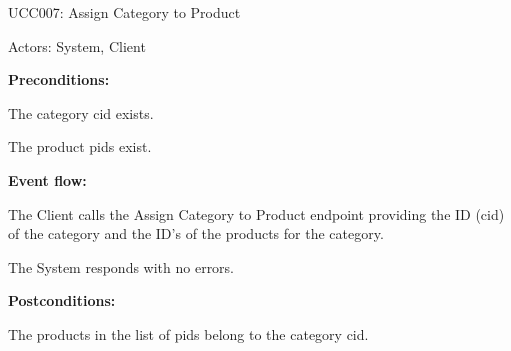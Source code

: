 \begin{ucbox}{UCC007: Assign Category to Product}
\label{UCC007}

Actors: System, Client

\textbf{Preconditions:}

\ucitem The category cid exists.

\ucitem The product pids exist.

\textbf{Event flow:}

\ucitem The Client calls the Assign Category to Product endpoint providing the ID (cid) of the category and the ID’s of the products for the category.

\ucitem The System responds with no errors.

\textbf{Postconditions:}

\ucitem The products in the list of pids belong to the category cid.

\end{ucbox}
\newpage